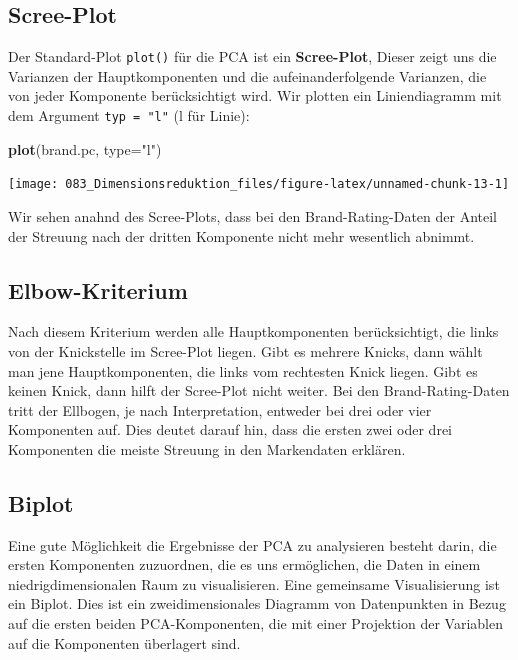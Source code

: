 \documentclass[12pt,]{book}
\newenvironment{Shaded}{\begin{snugshade}}{\end{snugshade}}
\newcommand{\KeywordTok}[1]{\textcolor[rgb]{0.13,0.29,0.53}{\textbf{{#1}}}}
\newcommand{\DataTypeTok}[1]{\textcolor[rgb]{0.13,0.29,0.53}{{#1}}}
\newcommand{\StringTok}[1]{\textcolor[rgb]{0.31,0.60,0.02}{{#1}}}
\newcommand{\NormalTok}[1]{{#1}}
\begin{document}
\subsection{Scree-Plot}\label{scree-plot}

Der Standard-Plot \texttt{plot()} für die PCA ist ein
\textbf{Scree-Plot}, Dieser zeigt uns die Varianzen der Hauptkomponenten
und die aufeinanderfolgende Varianzen, die von jeder Komponente
berücksichtigt wird. Wir plotten ein Liniendiagramm mit dem Argument
\texttt{typ\ =\ "l"} (l für Linie):

\begin{Shaded}
\begin{Highlighting}[]
\KeywordTok{plot}\NormalTok{(brand.pc, }\DataTypeTok{type=}\StringTok{"l"}\NormalTok{)}
\end{Highlighting}
\end{Shaded}

\begin{center}\texttt{[image: 083\_Dimensionsreduktion\_files/figure-latex/unnamed-chunk-13-1]} \end{center}

Wir sehen anahnd des Scree-Plots, dass bei den Brand-Rating-Daten der
Anteil der Streuung nach der dritten Komponente nicht mehr wesentlich
abnimmt.

\subsection{Elbow-Kriterium}\label{elbow-kriterium}

Nach diesem Kriterium werden alle Hauptkomponenten berücksichtigt, die
links von der Knickstelle im Scree-Plot liegen. Gibt es mehrere Knicks,
dann wählt man jene Hauptkomponenten, die links vom rechtesten Knick
liegen. Gibt es keinen Knick, dann hilft der Scree-Plot nicht weiter.
Bei den Brand-Rating-Daten tritt der Ellbogen, je nach Interpretation,
entweder bei drei oder vier Komponenten auf. Dies deutet darauf hin,
dass die ersten zwei oder drei Komponenten die meiste Streuung in den
Markendaten erklären.

\subsection{Biplot}\label{biplot}

Eine gute Möglichkeit die Ergebnisse der PCA zu analysieren besteht
darin, die ersten Komponenten zuzuordnen, die es uns ermöglichen, die
Daten in einem niedrigdimensionalen Raum zu visualisieren. Eine
gemeinsame Visualisierung ist ein Biplot. Dies ist ein zweidimensionales
Diagramm von Datenpunkten in Bezug auf die ersten beiden
PCA-Komponenten, die mit einer Projektion der Variablen auf die
Komponenten überlagert sind.
\end{document}
